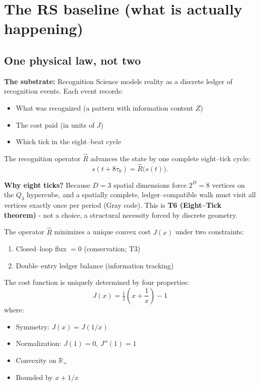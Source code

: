 \documentclass[11pt]{article}
\begin{document}
\section{The RS baseline (what is actually happening)}

\subsection{One physical law, not two}

\textbf{The substrate:} Recognition Science models reality as a discrete ledger of recognition events. Each event records:
\begin{itemize}[nosep]
  \item What was recognized (a pattern with information content $Z$)
  \item The cost paid (in units of $J$)
  \item Which tick in the eight--beat cycle
\end{itemize}

The recognition operator $\hat R$ advances the state by one complete eight--tick cycle:
\begin{equation}
  s(t+8\tau_0)=\hat R\big(s(t)\big).
\end{equation}

\textbf{Why eight ticks?} Because $D=3$ spatial dimensions force $2^D=8$ vertices on the $Q_3$ hypercube, and a spatially complete, ledger--compatible walk must visit all vertices exactly once per period (Gray code). This is \textbf{T6 (Eight--Tick theorem)} - not a choice, a structural necessity forced by discrete geometry.

The operator $\hat R$ minimizes a unique convex cost $J(x)$ under two constraints:
\begin{enumerate}[nosep]
  \item Closed--loop flux $= 0$ (conservation; T3)
  \item Double--entry ledger balance (information tracking)
\end{enumerate}

The cost function is uniquely determined by four properties:
\begin{equation}
  J(x)=\tfrac{1}{2}\!\left(x+\frac{1}{x}\right)-1
\end{equation}
where:
\begin{itemize}[nosep]
  \item Symmetry: $J(x) = J(1/x)$
  \item Normalization: $J(1) = 0$, $J''(1) = 1$
  \item Convexity on $\mathbb{R}_+$
  \item Bounded by $x + 1/x$
\end{itemize}
\end{document}
